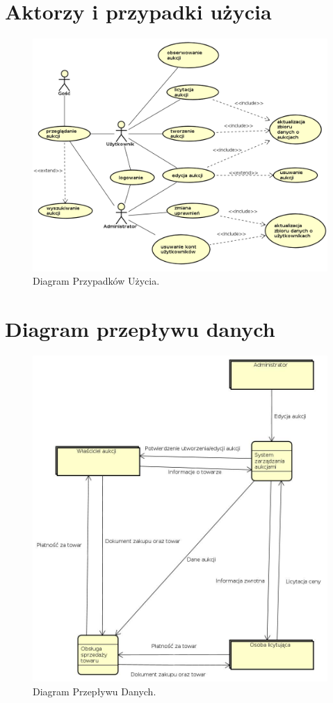 \documentclass[brudnopis]{xmgr}
\begin{document}
\section{Aktorzy i przypadki użycia}
\begin{figure}[!tbh]
\centering
\includegraphics[width=\linewidth]{fig/ucdiagram}
\caption{Diagram Przypadków Użycia.}
\end{figure}

\newpage

\section{Diagram przepływu danych}
\begin{figure}[!tbh]
\centering
\includegraphics[width=\linewidth]{fig/DFD}
\caption{Diagram Przepływu Danych.}
\end{figure}
\end{document}
